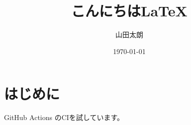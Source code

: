 \documentclass[uplatex]{jsarticle}
\title{こんにちは\LaTeX}
\author{山田太朗}
\date{\today}
\begin{document}
\maketitle

\section{はじめに}

GitHub Actions のCIを試しています。




\end{document}
